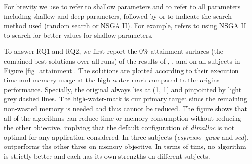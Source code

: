 For brevity we use \emph{\shallow} to refer to shallow parameters and \emph{\all} to refer to all parameters including shallow and deep parameters, followed by \emph{\randomsearch} or \emph{\nsgaii} to indicate the search method used (random search or NSGA II). For example, \sn{} refers to using NSGA II to search for better values for shallow parameters.

\begin{figure*}[htb]
	\centering
	\subfigure[espresso]{
		\label{fig_attainment_espresso}
		\scalebox{0.5}{\texttt{[image: espresso\_attainment\_best]}}%
	}
	\subfigure[gawk]{
		\label{fig_attainment_gawk}
		\scalebox{0.5}{\texttt{[image: gawk\_attainment\_best]}}%
	}
	\subfigure[flex]{
		\label{fig_attainment_flex}
		\scalebox{0.5}{\texttt{[image: flex\_attainment\_best]}}%
	}
	\subfigure[sed]{
		\label{fig_attainment_sed}
		\scalebox{0.5}{\texttt{[image: sed\_attainment\_best]}}%
	}
	\caption{0\%-attainment surfaces of the results of \sr{}, \sn{}, \dr{}, \dn{} over 20 runs for each application.}\label{fig_attainment}
\end{figure*}

To answer RQ1 and RQ2, we first report the 0\%-attainment surfaces (the combined best solutions over all runs) of the results of \sr{}, \sn{}, \dr{} and \dn{} on all subjects in Figure \ref{fig_attainment}. The solutions are plotted according to their execution time and memory usage at the high-water-mark compared to the original performance. Specially, the original always lies at (1, 1) and pinpointed by light grey dashed lines. The high-water-mark is our primary target since the remaining non-wasted memory is needed and thus cannot be reduced. 
The figure shows that all of the algorithms can reduce time or memory consumption without reducing the other objective, implying that the default configuration of \emph{dlmalloc} is not optimal for any application considered. In three subjects (\emph{espresso}, \emph{gawk} and \emph{sed}), \dn{} outperforms the other three on memory objective. In terms of time, no algorithm is strictly better and each has its own strengths on different subjects. 

